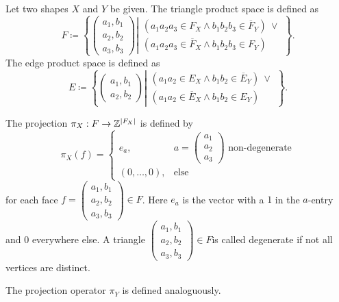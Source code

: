 \begin{definition}
Let two shapes $X$ and $Y$ be given.
The triangle product space is defined as
\begin{equation}
	F \coloneqq \left\{ 
	\begin{pmatrix}
		a_1, b_1 \\
		a_2, b_2 \\ 
		a_3, b_3
	\end{pmatrix} \left|
	\begin{array}{ll}
	    (a_1 a_2 a_3 \in F_X \wedge b_1 b_2 b_3 \in \overline{F}_Y )~\vee \\
	     (a_1 a_2 a_3 \in \overline{F}_X \wedge b_1 b_2 b_3 \in {F}_Y ) 
	\end{array} \right.
	\right\}.\nonumber
\end{equation}
The edge product space is defined as
\begin{equation}
	E \coloneqq \left\{ 
	\begin{pmatrix}
		a_1, b_1 \\
		a_2, b_2
	\end{pmatrix} \left|
	\begin{array}{ll}
	    (a_1 a_2 \in E_X \wedge b_1 b_2 \in \overline{E}_Y )~\vee\\
	    (a_1 a_2 \in \overline{E}_X \wedge b_1 b_2 \in {E}_Y )
	\end{array} \right.
	\right\}.\nonumber
\end{equation}
\end{definition}

\begin{definition}
The projection $\pi_X : F \rightarrow \mathbb{Z}^{\lvert F_X\rvert}$ is defined by
\begin{equation}
\pi_X(f) = \begin{cases}
e_a, & a = \begin{pmatrix} a_1 \\ a_2 \\ a_3 \end{pmatrix} \text{ non-degenerate}\\
(0,\ldots,0), & \text{else}
\end{cases}
\end{equation}
for each face $f = \begin{pmatrix} a_1,b_1\\a_2,b_2\\a_3,b_3\end{pmatrix} \in F$.
Here $e_a$ is the vector with a $1$ in the $a$-entry and $0$ everywhere else.
A triangle $\begin{pmatrix} a_1,b_1\\a_2,b_2\\a_3,b_3\end{pmatrix} \in F$is called degenerate if not all vertices are distinct.

The projection operator $\pi_Y$ is defined analoguously.
\end{definition}

